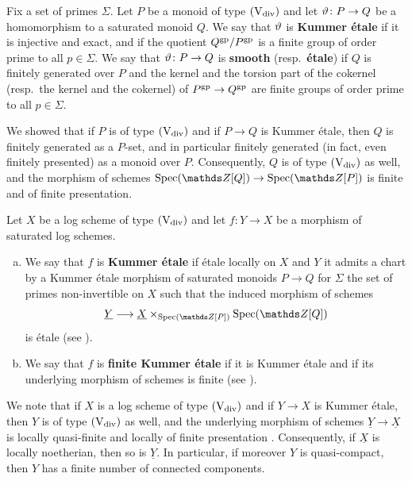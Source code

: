 \begin{defi} \label{def:Kummer-etale-monoid}
    Fix a set of primes $\Sigma$. Let $P$ be a monoid of type $(\mathrm{V}_{\rm div})$ and let $\vartheta\colon P\to Q$ be a homomorphism to a saturated monoid $Q$. We say that $\vartheta$ is {\bf Kummer \'etale} if it is injective and exact, and if the quotient $Q^{\rm gp}/P^{\rm gp}$ is a finite group of order prime to all $p\in \Sigma$. We say that $\vartheta \colon P\to Q$ is {\bf smooth} (resp.\ {\bf \'etale}) if $Q$ is finitely generated over $P$ and the kernel and the torsion part of the cokernel (resp.\ the kernel and the cokernel) of $P^{\rm gp}\to Q^{\rm gp}$ are finite groups of order prime to all $p\in \Sigma$.
\end{defi}

We showed \cite[Lemma~2.6.2]{AHLS-Log} that if $P$ is of type $(\mathrm{V}_{\rm div})$ and if $P\to Q$ is Kummer \'etale, then $Q$ is finitely generated as a $P$-set, and in particular finitely generated (in fact, even finitely presented) as a monoid over $P$. Consequently, $Q$ is of type $(\mathrm{V}_{\rm div})$ as well, and the morphism of schemes $\Spec(\bZ[Q])\to \Spec(\bZ[P])$ is finite and of finite presentation. 

\begin{defi} \label{def:Kummer-etale-map}
    Let $X$ be a log scheme of type $(\mathrm{V}_{\rm div})$ and let $f\colon Y\to X$ be a morphism of saturated log schemes. 
    \begin{enumerate}[(a)]
        \item 
        We say that $f$ is {\bf Kummer \'etale} if \'etale locally on $X$ and $Y$ it admits a chart by a Kummer \'etale morphism of saturated monoids $P\to Q$ for $\Sigma$ the set of primes non-invertible on $X$ such that the induced morphism of schemes
        \[ 
            \underline{Y} \la \underline{X}\times_{\Spec(\bZ[P])} \Spec(\bZ[Q])
        \]
        is \'etale (see \cite[Definition~3.5.1]{AHLS-Log}).
        \item 
        We say that $f$ is {\bf finite Kummer \'etale} if it is Kummer \'etale and if its underlying morphism of schemes is finite (see \cite[Definition~4.2.1 and Corollary~5.1.2]{AHLS-Log}).
    \end{enumerate}
\end{defi}

We note that if $X$ is a log scheme of type $(\mathrm{V}_{\rm div})$ and if $Y\to X$ is Kummer \'etale, then $Y$ is of type $(\mathrm{V}_{\rm div})$ as well, and the underlying morphism of schemes $\underline{Y}\to \underline{X}$ is locally quasi-finite and locally of finite presentation \cite[Proposition~5.1.2]{AHLS-Log}. Consequently, if $\underline{X}$ is locally noetherian, then so is $\underline{Y}$. In particular, if moreover $Y$ is quasi-compact, then $Y$ has a finite number of connected components.

